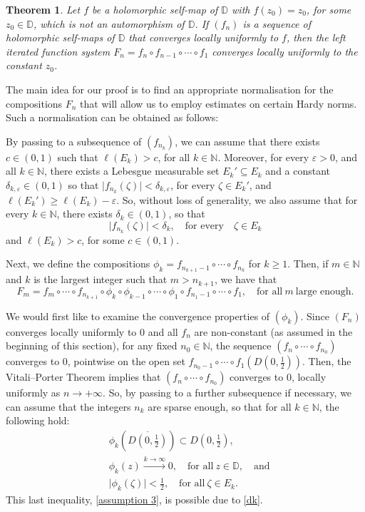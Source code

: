 \documentclass[11pt, reqno]{amsart}
\newtheorem{theorem}{Theorem}[section]
\theoremstyle{definition}
\numberwithin{equation}{section}
\newcommand{\N}{\mathbb{N}}
\newcommand{\D}{\mathbb{D}}
\renewcommand{\geq}{\geqslant}
\renewcommand{\epsilon}{\varepsilon}
\begin{document}
\begin{theorem}\label{thm: stability}
Let $f$ be a holomorphic self-map of $\D$ with $f(z_0)=z_0$, for some $z_0\in\D$, which is not an automorphism of $\D$. If $(f_n)$ is a sequence of holomorphic self-maps of $\D$ that converges locally uniformly to $f$, then the left iterated function system $F_n=f_n\circ f_{n-1}\circ\cdots \circ f_1$ converges locally uniformly to the constant $z_0$.
\end{theorem}


The main idea for our proof is to find an appropriate normalisation for the compositions $F_n$ that will allow us to employ estimates on certain Hardy norms. Such a normalisation can be obtained as follows:

By passing to a subsequence of $(f_{n_k})$, we can assume that there exists $c\in(0,1)$ such that $\ell(E_k)> c$, for all $k\in\N$. Moreover, for every $\epsilon>0$, and all $k\in\N$, there exists a Lebesgue measurable set $E_k'\subseteq E_k$ and a constant $\delta_{k,\epsilon}\in(0,1)$ so that $\lvert f_{n_k}(\zeta) \rvert<\delta_{k,\epsilon}$, for every $\zeta\in E_k'$, and $\ell(E_k')\geq \ell(E_k)-\epsilon$. So, without loss of generality, we also assume that for every $k\in\N$, there exists $\delta_k\in(0,1)$, so that 
\begin{equation}\label{dk}
\lvert f_{n_k}(\zeta) \rvert<\delta_k,\quad  \text{for every} \quad \zeta\in E_k
\end{equation}
and $\ell(E_k)> c$, for some $c\in(0,1)$.

Next, we define the compositions $\phi_k=f_{n_{k+1}-1}\circ\cdots\circ f_{n_k}$ for $k\geq 1$. Then, if $m\in\N$ and $k$ is the largest integer such that $m>n_{k+1}$, we have that 
\[
F_m= f_m\circ\cdots\circ f_{n_{k+1}}\circ \phi_k\circ\phi_{k-1}\circ\cdots\circ \phi_1\circ f_{n_1-1}\circ\cdots \circ f_1, \quad \text{for all}\ m \ \text{large enough}.
\]

We would first like to examine the convergence properties of $(\phi_k)$. Since $(F_n)$ converges locally uniformly to 0 and all $f_n$ are non-constant (as assumed in the beginning of this section), for any fixed $n_0\in\N$, the sequence $(f_n\circ\cdots\circ f_{n_0})$ converges to 0, pointwise on the open set $f_{n_0-1}\circ\cdots \circ f_1\left(D(0,\tfrac{1}{2})\right)$. Then, the Vitali--Porter Theorem \cite[p.75]{schiff} implies that $(f_n\circ\cdots\circ f_{n_0})$ converges to 0, locally uniformly as $n\to+\infty$. So, by passing to a further subsequence if necessary, we can assume that the integers $n_k$ are sparse enough, so that for all $k\in\N$, the following hold:
\begin{align}
&\phi_k\left(\overline{D\left(0,\frac{1}{2}\right)}\right)\subset D\left(0,\frac{1}{2}\right),\label{assumption 1} \\
&\phi_k(z)\xrightarrow{k\to\infty}0,\quad\text{for all}\ z\in\D,\quad  \text{and}\label{assumption 2}\\
&\lvert \phi_k(\zeta) \rvert<\frac{1}{2}, \quad \text{for all} \ \zeta\in E_k\label{assumption 3}.
\end{align}
This last inequality, \eqref{assumption 3}, is possible due to \eqref{dk}.
\end{document}
